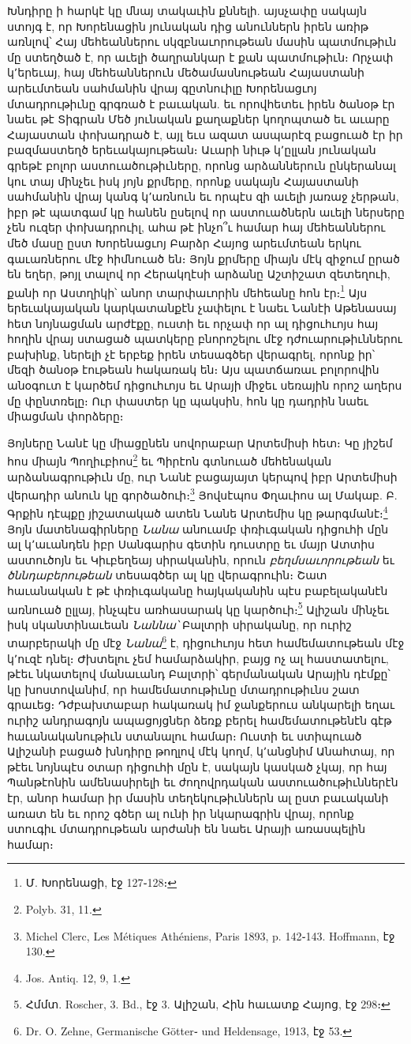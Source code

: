 \documentclass{article}
\begin{document}
{Խնդիրը ի հարկէ կը մնայ տակաւին քննելի. այսչափը սակայն ստոյգ է, որ Խորենացին յունական դից անուններն իրեն առիթ առնլով՝ Հայ մեհեաններու սկզբնաւորութեան մասին պատմութիւն մը ստեղծած է, որ աւելի ծաղրանկար է քան պատմութիւն։ Որչափ կ՚երեւայ, հայ մեհեաններուն մեծամասնութեան Հայաստանի արեւմտեան սահմանին վրայ գըտնուիլը Խորենացւոյ մտադրութիւնը գրգռած է բաւական. եւ որովհետեւ իրեն ծանօթ էր նաեւ թէ Տիգրան Մեծ յունական քաղաքներ կողոպտած եւ աւարը Հայաստան փոխադրած է, այլ եւս ազատ ասպարէզ բացուած էր իր բազմաստեղծ երեւակայութեան։ Աւարի նիւթ կ՚ըլլան յունական գրեթէ բոլոր աստուածութիւները, որոնց արձաններուն ընկերանալ կու տայ մինչեւ իսկ յոյն քրմերը, որոնք սակայն Հայաստանի սահմանին վրայ կանգ կ՚առնուն եւ որպէս զի աւելի յառաջ չերթան, իբր թէ պատգամ կը հանեն ըսելով որ աստուածներն աւելի ներսերը չեն ուզեր փոխադրուիլ, ահա թէ ինչո՞ւ համար հայ մեհեաններու մեծ մասը ըստ Խորենացւոյ Բարձր Հայոց արեւմտեան երկու գաւառներու մէջ հիմնուած են։ Յոյն քրմերը միայն մէկ զիջում ըրած են եղեր, թոյլ տալով որ Հերակղէսի արձանը Աշտիշատ զետեղուի, քանի որ Աստղիկի՝ անոր տարփաւորին մեհեանը հոն էր։\footnote{Մ. Խորենացի, էջ 127֊128։} Այս երեւակայական կարկատանքէն չափելու է նաեւ Նանէի Աթենասայ հետ նոյնացման արժէքը, ուստի եւ որչափ որ ալ դիցուհւոյս հայ հողին վրայ ստացած պատկերը բնորոշելու մէջ դժուարութիւններու բախինք, ներելի չէ երբեք իրեն տեսագծեր վերագրել, որոնք իր՝ մեզի ծանօթ էութեան հակառակ են։ Այս պատճառաւ բոլորովին անօգուտ է կարծեմ դիցուհւոյս եւ Արայի միջեւ սեռային որոշ աղերս մը փընտռելը։ Ուր փաստեր կը պակսին, հոն կը դադրին նաեւ միացման փորձերը։

Յոյները Նանէ կը միացընեն սովորաբար Արտեմիսի հետ։ Կը յիշեմ հոս միայն Պողիւբիոս\footnote{Polyb. 31, 11.} եւ Պիրէոն գտնուած մեհենական արձանագրութիւն մը, ուր Նանէ բացայայտ կերպով իբր Արտեմիսի վերադիր անուն կը գործածուի։\footnote{Michel Clerc, Les Métiques Athéniens, Paris 1893, p. 142֊143. Hoffmann, էջ 130.} Յովսէպոս Փղաւիոս ալ Մակաբ. Բ. Գրքին դէպքը յիշատակած ատեն Նանե Արտեմիս կը թարգմանէ։\footnote{Jos. Antiq. 12, 9, 1.} Յոյն մատենագիրները \emph{Նանա} անուամբ փռիւգական դիցուհի մըն ալ կ՚աւանդեն իբր Սանգարիս գետին դուստրը եւ մայր Ատտիս աստուծոյն եւ Կիւբեղեայ սիրականին, որուն \emph{բեղմսաւորութեան} եւ \emph{ծննդաբերութեան} տեսագծեր ալ կը վերագրուին։ Շատ հաւանական է թէ փռիւգականը հայկականին պէս բաբելականէն առնուած ըլլայ, ինչպէս առհասարակ կը կարծուի։\footnote{Հմմտ. Roscher, 3. Bd., էջ 3. Ալիշան, Հին հաւատք Հայոց, էջ 298։} Ալիշան մինչեւ իսկ սկանտինաւեան \emph{Նաննա՝} Բալտրի սիրականը, որ ուրիշ տարբերակի մը մէջ \emph{Նանա}\footnote{Dr. O. Zehne, Germanische Götter֊ und Heldensage, 1913, էջ 53.} է, դիցուհւոյս հետ համեմատութեան մէջ կ՚ուզէ դնել։ Ժխտելու չեմ համարձակիր, բայց ոչ ալ հաստատելու, թէեւ նկատելով մանաւանդ Բալտրի՝ գերմանական Արային դէմքը՝ կը խոստովանիմ, որ համեմատութիւնը մտադրութիւնս շատ գրաւեց։ Դժբախտաբար հակառակ իմ ջանքերուս անկարելի եղաւ ուրիշ անդրագոյն ապացոյցներ ձեռք բերել համեմատութենէն գէթ հաւանականութիւն ստանալու համար։ Ուստի եւ ստիպուած Ալիշանի բացած խնդիրը թողլով մէկ կողմ, կ՚անցնիմ Անահտայ, որ թէեւ նոյնպէս օտար դիցուհի մըն է, սակայն կասկած չկայ, որ հայ Պանթէոնին ամենասիրելի եւ ժողովրդական աստուածութիւններէն էր, անոր համար իր մասին տեղեկութիւններն ալ ըստ բաւականի առատ են եւ որոշ գծեր ալ ունի իր նկարագրին վրայ, որոնք ստուգիւ մտադրութեան արժանի են նաեւ Արայի առասպելին համար։

}
\end{document}
